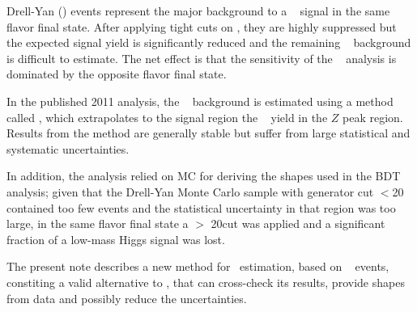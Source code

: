 Drell-Yan (\dyll) events represent the major background to a \hww~ signal in the same flavor final state.
After applying tight cuts on \met, they are highly suppressed but the expected signal yield is significantly 
reduced and the remaining \dyll~ background is difficult to estimate.
The net effect is that the sensitivity of the \hww~ analysis is dominated by the opposite flavor final state.

In the published 2011 analysis\cite{ref:hwwpaper}, the \dyll~ background is estimated using a method called \routin\cite{ref:hwwsmurfs}, 
which extrapolates to the signal region the \dyll~ yield in the $Z$ peak region. 
Results from the \routin method are generally stable but suffer from large statistical and systematic uncertainties.

In addition, the analysis relied on MC for deriving the shapes used in the BDT analysis; 
given that the Drell-Yan Monte Carlo sample with generator cut \mll$<$20 \GeVcc contained too few events and the statistical uncertainty 
in that region was too large, in the same flavor final state a \mll$>$ 20\GeVcc cut was applied and a significant fraction 
of a low-mass Higgs signal was lost.

The present note describes a new method for \dyll~estimation, based on \gjets~ events, constiting a valid alternative 
to \routin, that can cross-check its results, provide shapes from data and possibly reduce the uncertainties.
